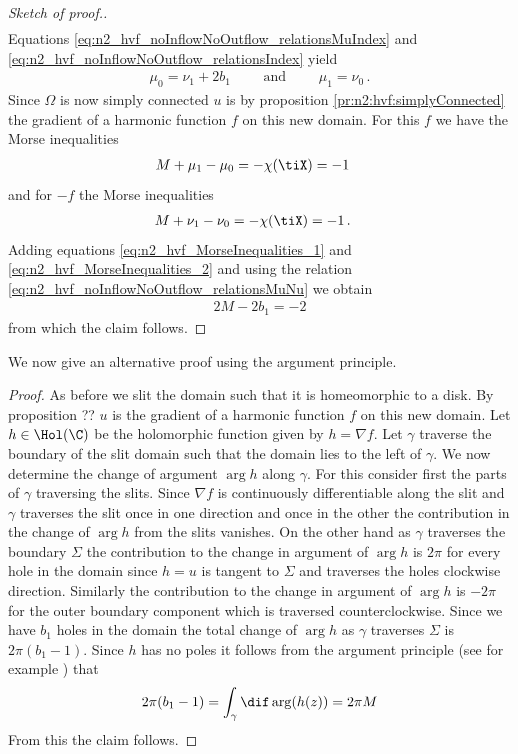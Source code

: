 \begin{proof}[Sketch of proof.]
\begin{align}
  \end{align}
  Equations \eqref{eq:n2_hvf_noInflowNoOutflow_relationsMuIndex} and \eqref{eq:n2_hvf_noInflowNoOutflow_relationsIndex}
  yield 
  \begin{align}
    \mu_0=\nu_1+2b_1 \qquad\text{ and }\qquad
    \mu_1=\nu_0\,.\label{eq:n2_hvf_noInflowNoOutflow_relationsMuNu}
  \end{align}
  Since $\Omega$ is now simply connected $u$ is 
  by proposition \ref{pr:n2:hvf:simplyConnected}
  the gradient of a harmonic function $f$ on this new domain.
  For this $f$ we have the Morse inequalities
  \begin{align}
    M+\mu_1-\mu_0&=-\chi(\tiX)=-1 \label{eq:n2_hvf_MorseInequalities_1}
  \end{align}
  and for $-f$ the Morse inequalities
  \begin{align}
    M+\nu_1-\nu_0&=-\chi(\tiX)=-1\,. \label{eq:n2_hvf_MorseInequalities_2}
  \end{align}
  Adding equations \eqref{eq:n2_hvf_MorseInequalities_1} and \eqref{eq:n2_hvf_MorseInequalities_2} and using the relation
  \eqref{eq:n2_hvf_noInflowNoOutflow_relationsMuNu} we obtain
  \begin{align*}
    2M-2b_1=-2
  \end{align*}
  from which the claim follows.
\end{proof}
We now give an alternative proof using the argument principle.
\begin{proof}
  As before we slit the domain such that it is homeomorphic to a disk. By proposition ?? $u$ is the gradient of a
  harmonic function $f$ on this new domain. Let $h\in\Hol(\C)$ be the holomorphic function given by $h=\nabla f$.
  Let $\gamma$ traverse the boundary of the slit domain such that the domain lies to the left of $\gamma$.
  We now determine the change of argument $\arg h$ along $\gamma$. For this
  consider first the parts of $\gamma$ traversing the slits. Since $\nabla f$ is continuously differentiable
  along the slit and $\gamma$ traverses the slit once in one direction and once in the other 
  the contribution in the change of $\arg h$ from the slits vanishes.
  On the other hand as $\gamma$ traverses the boundary $\Sigma$ the contribution to the change in
  argument of $\arg h$ is $2\pi$ for every hole in the domain 
  since $h=u$ is tangent to $\Sigma$ and traverses the holes clockwise direction.
  Similarly the contribution to the change in argument of $\arg h$ is $-2\pi$ for the outer boundary component
  which is traversed counterclockwise.
  Since we have $b_1$ holes in the domain the total change of $\arg h$ as $\gamma$ traverses $\Sigma$ is
  $2\pi(b_1-1)$.
  Since $h$ has no poles it follows from the argument principle (see for example \cite[Chapter VIII]{Gamelin2001}) that
  \begin{align}
    2\pi(b_1-1)=\int_\gamma\dif\arg (h(z)) =  2\pi M
  \end{align}
  From this the claim follows.
\end{proof}

